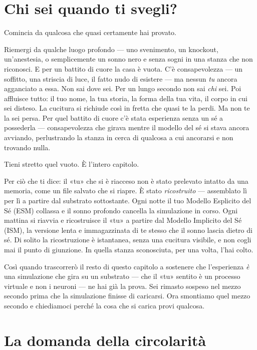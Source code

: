 \documentclass[11pt, twoside, openright]{book}
\begin{document}
\section*{Chi sei quando ti svegli?}

Comincia da qualcosa che quasi certamente hai provato.

Riemergi da qualche luogo profondo --- uno svenimento, un knockout, un'anestesia, o semplicemente un sonno nero e senza sogni in una stanza che non riconosci. E per un battito di cuore la casa è vuota. C'è consapevolezza --- un soffitto, una striscia di luce, il fatto nudo di esistere --- ma nessun \textit{tu} ancora agganciato a essa. Non sai dove sei. Per un lungo secondo non sai \textit{chi} sei. Poi affluisce tutto: il tuo nome, la tua storia, la forma della tua vita, il corpo in cui sei disteso. La cucitura si richiude così in fretta che quasi te la perdi. Ma non te la sei persa. Per quel battito di cuore c'è stata esperienza senza un sé a possederla --- consapevolezza che girava mentre il modello del sé si stava ancora avviando, perlustrando la stanza in cerca di qualcosa a cui ancorarsi e non trovando nulla.

Tieni stretto quel vuoto. È l'intero capitolo.

Per ciò che ti dice: il «tu» che si è riacceso non è stato prelevato intatto da una memoria, come un file salvato che si riapre. È stato \textit{ricostruito} --- assemblato lì per lì a partire dal substrato sottostante. Ogni notte il tuo Modello Esplicito del Sé (ESM) collassa e il sonno profondo cancella la simulazione in corso. Ogni mattina si riavvia e ricostruisce il «tu» a partire dal Modello Implicito del Sé (ISM), la versione lenta e immagazzinata di te stesso che il sonno lascia dietro di sé. Di solito la ricostruzione è istantanea, senza una cucitura visibile, e non cogli mai il punto di giunzione. In quella stanza sconosciuta, per una volta, l'hai colto.

Così quando trascorrerò il resto di questo capitolo a sostenere che l'esperienza \textit{è} una simulazione che gira su un substrato --- che il «tu» sentito è un processo virtuale e non i neuroni --- ne hai già la prova. Sei rimasto sospeso nel mezzo secondo prima che la simulazione finisse di caricarsi. Ora smontiamo quel mezzo secondo e chiediamoci perché la cosa che si carica provi qualcosa.

\section*{La domanda della circolarità}
\end{document}
